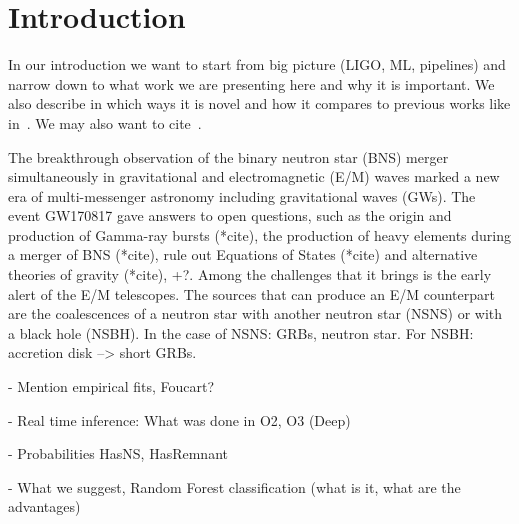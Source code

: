 \section{Introduction}
In our introduction we want to start from big picture (LIGO, ML, pipelines)
and narrow down to what work we are presenting here and why it is important. We
also describe in which ways it is novel and how it compares to previous works
like in~\cite{Chatterjee:2019avs}. We may also want to cite~\cite{Sachdev:2020lfd}. 


The breakthrough observation of the binary neutron star (BNS) merger simultaneously in gravitational and electromagnetic (E/M) waves \cite{LIGOScientific:2017ync} marked a new era of multi-messenger astronomy including gravitational waves (GWs). The event GW170817 gave answers to open questions, such as the origin and production of Gamma-ray bursts (*cite), the production of heavy elements during a merger of BNS (*cite), rule out Equations of States (*cite) and alternative theories of gravity (*cite), +?. Among the challenges that it brings is the early alert of the E/M telescopes. The sources that can produce an E/M counterpart are the coalescences of a neutron star with another neutron star (NSNS) or with a black hole (NSBH). In the case of NSNS: GRBs, neutron star. For NSBH: accretion disk --> short GRBs.

- Mention empirical fits, Foucart?

- Real time inference: What was done in O2, O3 (Deep)

- Probabilities HasNS, HasRemnant

- What we suggest, Random Forest classification (what is it, what are the advantages)
